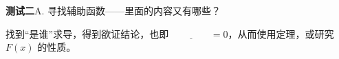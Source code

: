 \documentclass[a4paper,12pt]{article}
\newcommand{\blank}[1][3em]{\underline{\hspace{#1}}}
\begin{document}
\vspace{1.2em}
\blank[46em]

\vspace{1.6em}
\blank[46em]

\vspace{1.6em}
\blank[46em]

\vspace{1.6em}
\blank[46em]

\newpage

\textbf{测试二}\quad A. 寻找辅助函数——里面的内容又有哪些？

\vspace{1em}

找到``是谁''求导，得到欲证结论，也即 $\blank[4em] = 0$，从而使用\blank[4em]定理，或研究 $F(x)$ 的性质。

\vspace{1em}
\end{document}
